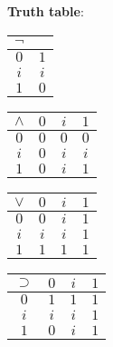 \documentclass[a4paper]{article}
\begin{document}
\textbf{Truth table}:
\begin{center}
	\renewcommand{\arraystretch}{1.2}
	\begin{tabular}{|c|c|}
		\hline
		$\lnot$ & \\\hline
		$0$ & $1$ \\
		$i$ & $i$ \\
		$1$ & $0$ \\\hline
	\end{tabular}
	\quad
	\begin{tabular}{|c|ccc|}
		\hline
		$\land$ & $0$ & $i$ & $1$ \\\hline
		$0$ & $0$ & $0$ & $0$ \\
		$i$ & $0$ & $i$ & $i$ \\
		$1$ & $0$ & $i$ & $1$ \\\hline
	\end{tabular}
	\quad
	\begin{tabular}{|c|ccc|}
		\hline
		$\lor$ & $0$ & $i$ & $1$ \\\hline
		$0$ & $0$ & $i$ & $1$ \\
		$i$ & $i$ & $i$ & $1$ \\
		$1$ & $1$ & $1$ & $1$ \\\hline
	\end{tabular}
	\quad
	\begin{tabular}{|c|ccc|}
		\hline
		$\supset$ & $0$ & $i$ & $1$ \\\hline
		$0$ & $1$ & $1$ & $1$ \\
		$i$ & $i$ & $i$ & $1$ \\
		$1$ & $0$ & $i$ & $1$ \\\hline
	\end{tabular}
\end{center}

\pagebreak
\end{document}
